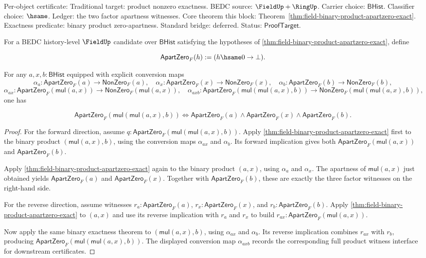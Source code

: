 Per-object certificate: Traditional target: product nonzero exactness. BEDC
source: $\FieldUp+\RingUp$. Carrier choice: $\mathsf{BHist}$. Classifier
choice: $\hsame$. Ledger: the two factor apartness witnesses. Core theorem
this block: Theorem~\ref{thm:field-binary-product-apartzero-exact}.
Exactness predicate: binary product zero-apartness. Standard bridge:
deferred. Status: $\mathsf{ProofTarget}$.

\begin{theorem}
\label{thm:field-three-factor-product-apartzero-exact}
For a BEDC history-level $\FieldUp$ candidate over $\mathsf{BHist}$ satisfying
the hypotheses of
\autoref{thm:field-binary-product-apartzero-exact}, define

$$
\mathsf{ApartZero}_F(h) := (h\hsame0\to\bot).
$$

For any $a,x,b:\mathsf{BHist}$ equipped with explicit conversion maps
$$
\alpha_a:\mathsf{ApartZero}_F(a)\to\mathsf{NonZero}_F(a),\quad
\alpha_x:\mathsf{ApartZero}_F(x)\to\mathsf{NonZero}_F(x),\quad
\alpha_b:\mathsf{ApartZero}_F(b)\to\mathsf{NonZero}_F(b),
$$
$$
\alpha_{ax}:\mathsf{ApartZero}_F(\mathsf{mul}(a,x))\to
\mathsf{NonZero}_F(\mathsf{mul}(a,x)),\quad
\alpha_{axb}:\mathsf{ApartZero}_F(\mathsf{mul}(\mathsf{mul}(a,x),b))\to
\mathsf{NonZero}_F(\mathsf{mul}(\mathsf{mul}(a,x),b)),
$$
one has

$$
\mathsf{ApartZero}_F(\mathsf{mul}(\mathsf{mul}(a,x),b))
\Longleftrightarrow
\mathsf{ApartZero}_F(a)\land\mathsf{ApartZero}_F(x)\land
\mathsf{ApartZero}_F(b).
$$
\end{theorem}
\begin{proof}
For the forward direction, assume
$q:\mathsf{ApartZero}_F(\mathsf{mul}(\mathsf{mul}(a,x),b))$. Apply
\autoref{thm:field-binary-product-apartzero-exact} first to the binary product
$(\mathsf{mul}(a,x),b)$, using the conversion maps $\alpha_{ax}$ and
$\alpha_b$. Its forward implication gives both
$\mathsf{ApartZero}_F(\mathsf{mul}(a,x))$ and $\mathsf{ApartZero}_F(b)$.

Apply \autoref{thm:field-binary-product-apartzero-exact} again to the binary
product $(a,x)$, using $\alpha_a$ and $\alpha_x$. The apartness of
$\mathsf{mul}(a,x)$ just obtained yields $\mathsf{ApartZero}_F(a)$ and
$\mathsf{ApartZero}_F(x)$. Together with $\mathsf{ApartZero}_F(b)$, these are
exactly the three factor witnesses on the right-hand side.

For the reverse direction, assume witnesses
$r_a:\mathsf{ApartZero}_F(a)$, $r_x:\mathsf{ApartZero}_F(x)$, and
$r_b:\mathsf{ApartZero}_F(b)$. Apply
\autoref{thm:field-binary-product-apartzero-exact} to $(a,x)$ and use its
reverse implication with $r_a$ and $r_x$ to build
$r_{ax}:\mathsf{ApartZero}_F(\mathsf{mul}(a,x))$.

Now apply the same binary exactness theorem to $(\mathsf{mul}(a,x),b)$, using
$\alpha_{ax}$ and $\alpha_b$. Its reverse implication combines $r_{ax}$ with
$r_b$, producing
$\mathsf{ApartZero}_F(\mathsf{mul}(\mathsf{mul}(a,x),b))$.
The displayed conversion map $\alpha_{axb}$ records the corresponding full
product witness interface for downstream certificates.
\end{proof}

